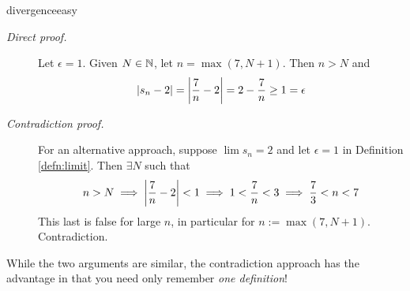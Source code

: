 \begin{examples}{}{divergenceeasy}
\begin{enumerate}
	  \begin{description}			
	  	\item[\normalfont\emph{Direct proof.}] Let $\epsilon=1$. Given $N\in\mathbb{N}$, let $n=\max(7,N+1)$. Then $n>N$ and 
	  	\[
	  		\left| s_n-2\right|=\left| \frac 7n-2\right|=2-\frac 7n\ge 1=\epsilon
	  	\]

  	
  		\item[\normalfont\emph{Contradiction proof.}] For an alternative approach, suppose $\lim s_n=2$ and let $\epsilon=1$ in Definition \ref{defn:limit}. Then $\exists N$ such that
  		\[
  			n>N\implies \left| \frac 7n-2\right|<1 \implies 1<\frac 7n<3\implies \frac 73<n<7
  		\]
  		This last is false for large $n$, in particular for $n:=\max(7,N+1)$. Contradiction.
	  \end{description}
  	While the two arguments are similar, the contradiction approach has the advantage in that you need only remember \emph{one definition}!





\end{enumerate}
\end{examples}
